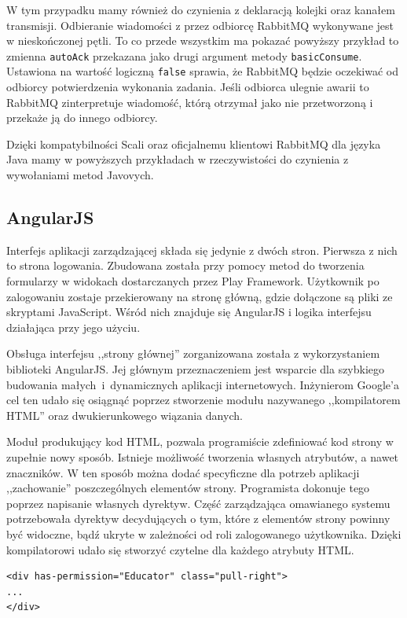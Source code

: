 \documentclass[wimgr]{xmgr}
\begin{document}
W tym przypadku mamy również do czynienia z deklaracją kolejki oraz kanałem transmisji. Odbieranie wiadomości z przez odbiorcę RabbitMQ wykonywane jest w nieskończonej pętli. To co przede wszystkim ma pokazać powyższy przykład to zmienna \texttt{autoAck} przekazana jako drugi argument metody \texttt{basicConsume}. Ustawiona na wartość logiczną \texttt{false} sprawia, że RabbitMQ będzie oczekiwać od odbiorcy potwierdzenia wykonania zadania. Jeśli odbiorca ulegnie awarii to RabbitMQ zinterpretuje wiadomość, którą otrzymał jako nie przetworzoną i przekaże ją do innego odbiorcy.

Dzięki kompatybilności Scali oraz oficjalnemu klientowi RabbitMQ dla języka Java mamy w powyższych przykładach w rzeczywistości do czynienia z wywołaniami metod Javovych.

\subsection{AngularJS}

Interfejs aplikacji zarządzającej składa się jedynie z dwóch stron. Pierwsza z nich to strona logowania. Zbudowana została przy pomocy metod do tworzenia formularzy w widokach dostarczanych przez Play Framework. Użytkownik po zalogowaniu zostaje przekierowany na stronę główną, gdzie dołączone są pliki ze skryptami JavaScript. Wśród nich znajduje się AngularJS i logika interfejsu działająca przy jego użyciu.

Obsługa interfejsu ,,strony głównej'' zorganizowana została z wykorzystaniem biblioteki AngularJS. Jej głównym przeznaczeniem jest wsparcie dla szybkiego budowania małych~i~dynamicznych aplikacji internetowych. Inżynierom Google'a cel ten udało się osiągnąć poprzez stworzenie modułu nazywanego ,,kompilatorem HTML'' oraz dwukierunkowego wiązania danych.

Moduł produkujący kod HTML, pozwala programiście zdefiniować kod strony w zupełnie nowy sposób. Istnieje możliwość tworzenia własnych atrybutów, a nawet znaczników. W ten sposób można dodać specyficzne dla potrzeb aplikacji ,,zachowanie'' poszczególnych elementów strony. Programista dokonuje tego poprzez napisanie własnych dyrektyw. Część zarządzająca omawianego systemu potrzebowała dyrektyw decydujących o tym, które z elementów strony powinny być widoczne, bądź ukryte w zależności od roli zalogowanego użytkownika. Dzięki kompilatorowi udało się stworzyć czytelne dla każdego atrybuty HTML.

\begin{verbatim}
<div has-permission="Educator" class="pull-right">
...
</div>
\end{verbatim}
\end{document}

